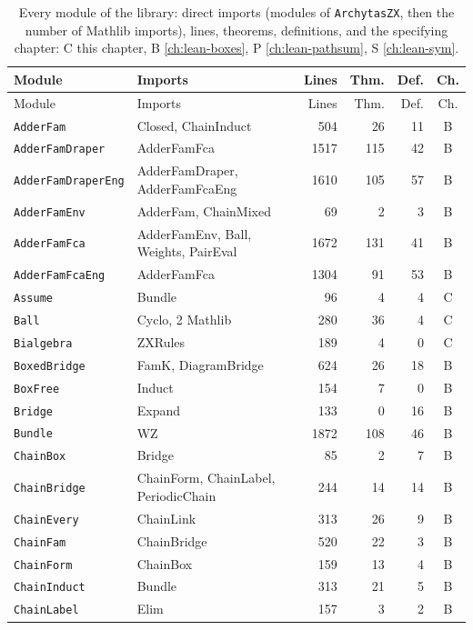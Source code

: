 {\small
\begin{xltabular}{\textwidth}{@{}l>{\raggedright\arraybackslash}Xrrrc@{}}
\caption{Every module of the library: direct imports (modules of \texttt{ArchytasZX}, then the number
of Mathlib imports), lines, theorems, definitions, and the specifying chapter: C this chapter,
B \cref{ch:lean-boxes}, P \cref{ch:lean-pathsum}, S \cref{ch:lean-sym}.}\label{tab:lean-core-imports}\\
\toprule
Module & Imports & Lines & Thm. & Def. & Ch. \\
\midrule
\endfirsthead
\toprule
Module & Imports & Lines & Thm. & Def. & Ch. \\
\midrule
\endhead
\bottomrule
\endfoot
\texttt{AdderFam} & Closed, ChainInduct & 504 & 26 & 11 & B \\
\texttt{AdderFamDraper} & AdderFamFca & 1517 & 115 & 42 & B \\
\texttt{AdderFamDraperEng} & AdderFamDraper, AdderFamFcaEng & 1610 & 105 & 57 & B \\
\texttt{AdderFamEnv} & AdderFam, ChainMixed & 69 & 2 & 3 & B \\
\texttt{AdderFamFca} & AdderFamEnv, Ball, Weights, PairEval & 1672 & 131 & 41 & B \\
\texttt{AdderFamFcaEng} & AdderFamFca & 1304 & 91 & 53 & B \\
\texttt{Assume} & Bundle & 96 & 4 & 4 & C \\
\texttt{Ball} & Cyclo, 2 Mathlib & 280 & 36 & 4 & C \\
\texttt{Bialgebra} & ZXRules & 189 & 4 & 0 & C \\
\texttt{BoxedBridge} & FamK, DiagramBridge & 624 & 26 & 18 & B \\
\texttt{BoxFree} & Induct & 154 & 7 & 0 & B \\
\texttt{Bridge} & Expand & 133 & 0 & 16 & B \\
\texttt{Bundle} & WZ & 1872 & 108 & 46 & B \\
\texttt{ChainBox} & Bridge & 85 & 2 & 7 & B \\
\texttt{ChainBridge} & ChainForm, ChainLabel, PeriodicChain & 244 & 14 & 14 & B \\
\texttt{ChainEvery} & ChainLink & 313 & 26 & 9 & B \\
\texttt{ChainFam} & ChainBridge & 520 & 22 & 3 & B \\
\texttt{ChainForm} & ChainBox & 159 & 13 & 4 & B \\
\texttt{ChainInduct} & Bundle & 313 & 21 & 5 & B \\
\texttt{ChainLabel} & Elim & 157 & 3 & 2 & B \\

\end{xltabular}}
